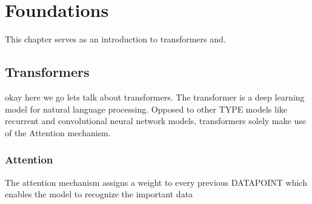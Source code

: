 \chapter{Foundations}
This chapter serves as an introduction to transformers and.

\section{Transformers}
okay here we go lets talk about transformers.
The transformer is a deep learning model for natural language processing. Opposed to other TYPE models like recurrent and convolutional neural network models, transformers solely make use of the Attention mechanism.

\subsection{Attention}
The attention mechanism assigns a weight to every previous DATAPOINT which enables the model to recognize the important data